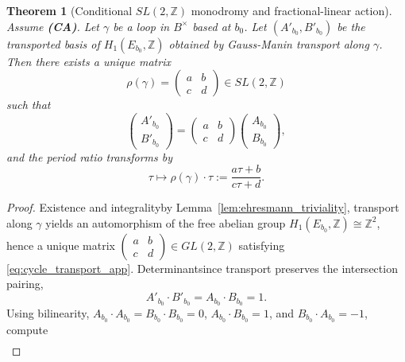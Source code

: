 \documentclass[11pt]{article}
\newtheorem{theorem}{Theorem}[section]
\theoremstyle{remark}
\begin{document}
{\begin{theorem}[Conditional $SL(2,\mathbb{Z})$ monodromy and fractional-linear action]\label{thm:SL2Z_monodromy}
Assume \textbf{(CA)}. Let $\gamma$ be a loop in $B^\times$ based at $b_0$. Let $(A'_{b_0},B'_{b_0})$ be the transported basis of $H_1(E_{b_0},\mathbb{Z})$ obtained by Gauss-Manin transport along $\gamma$. Then there exists a unique matrix
\begin{equation}\label{eq:rho_matrix}
\rho(\gamma)=\begin{pmatrix}a&b\\ c&d\end{pmatrix}\in SL(2,\mathbb{Z})
\end{equation}
such that
\begin{equation}\label{eq:cycle_transport_app}
\begin{pmatrix}A'_{b_0}\\ B'_{b_0}\end{pmatrix}=\begin{pmatrix}a&b\\ c&d\end{pmatrix}\begin{pmatrix}A_{b_0}\\ B_{b_0}\end{pmatrix},
\end{equation}
and the period ratio transforms by
\begin{equation}\label{eq:tau_fractional_linear}
\tau\longmapsto \rho(\gamma)\cdot \tau:=\frac{a\tau+b}{c\tau+d}.
\end{equation}
\end{theorem}
\begin{proof}
Existence and integrality\:by Lemma~\ref{lem:ehresmann_triviality}, transport along $\gamma$ yields an automorphism of the free abelian group $H_1(E_{b_0},\mathbb{Z})\cong \mathbb{Z}^2$, hence a unique matrix $\begin{pmatrix}a&b\\ c&d\end{pmatrix}\in GL(2,\mathbb{Z})$ satisfying \eqref{eq:cycle_transport_app}. Determinant\:since transport preserves the intersection pairing,
\begin{equation}\label{eq:intersection_preserved}
A'_{b_0}\cdot B'_{b_0}=A_{b_0}\cdot B_{b_0}=1.
\end{equation}
Using bilinearity, $A_{b_0}\cdot A_{b_0}=B_{b_0}\cdot B_{b_0}=0$, $A_{b_0}\cdot B_{b_0}=1$, and $B_{b_0}\cdot A_{b_0}=-1$, compute
\begin{align}\label{eq:det_calc_app}

\end{align}
\end{proof}}
\end{document}

